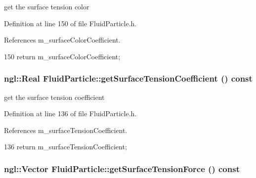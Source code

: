 get the surface tension color 



Definition at line 150 of file FluidParticle.h.



References m\_\-surfaceColorCoefficient.




\begin{DoxyCode}
150 { return m_surfaceColorCoefficient; }
\end{DoxyCode}


\hypertarget{class_fluid_particle_a5a4b8fee5183ee621b23f83644bfe434}{
\subsubsection[{getSurfaceTensionCoefficient}]{\setlength{\rightskip}{0pt plus 5cm}ngl::Real FluidParticle::getSurfaceTensionCoefficient () const}}
\label{class_fluid_particle_a5a4b8fee5183ee621b23f83644bfe434}


get the surface tension coefficient 



Definition at line 136 of file FluidParticle.h.



References m\_\-surfaceTensionCoefficient.




\begin{DoxyCode}
136 { return m_surfaceTensionCoefficient; }
\end{DoxyCode}


\hypertarget{class_fluid_particle_a8c8125b381ee8f354bb38e199a865dfe}{
\subsubsection[{getSurfaceTensionForce}]{\setlength{\rightskip}{0pt plus 5cm}ngl::Vector FluidParticle::getSurfaceTensionForce () const}}
\label{class_fluid_particle_a8c8125b381ee8f354bb38e199a865dfe}


